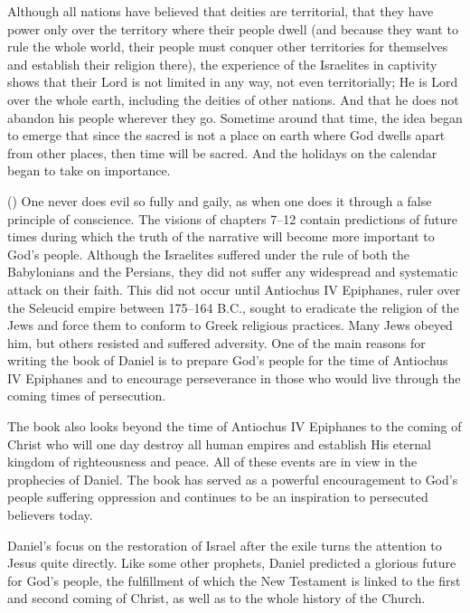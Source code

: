 Although all nations have believed that deities are territorial, that they have power only over the territory where their people dwell (and because they want to rule the whole world, their people must conquer other territories for themselves and establish their religion there), the experience of the Israelites in captivity shows that their Lord is not limited in any way, not even territorially; He is Lord over the whole earth, including the deities of other nations. And that he does not abandon his people wherever they go. Sometime around that time, the idea began to emerge that since the sacred is not a place on earth where God dwells apart from other places, then time will be sacred. And the holidays on the calendar began to take on importance. 


 (\kern-2mm) {
One never does evil so fully and gaily, 
as when one does it through a false principle of conscience.
}
The visions of chapters 7--12 contain predictions of future times during which the truth of the narrative will become more important to God's people.
Although the Israelites suffered under the rule of both the Babylonians and the Persians, they did not suffer any widespread and systematic attack on their faith. This did not occur until Antiochus IV Epiphanes, ruler over the Seleucid empire between 175--164 B.C., sought to eradicate the religion of the Jews and force them to conform to Greek religious practices. Many Jews obeyed him, but others resisted and suffered adversity. 
One of the main reasons for writing the book of Daniel is to prepare God's people for the time of Antiochus IV Epiphanes and to encourage perseverance in those who would live through the coming times of persecution.


The book also looks beyond the time of Antiochus IV Epiphanes to the coming of Christ who will one day destroy all human empires and establish His eternal kingdom of righteousness and peace. All of these events are in view in the prophecies of Daniel.
The book has served as a powerful encouragement to God's people suffering oppression and continues to be an inspiration to persecuted believers today. 



Daniel's focus on the restoration of Israel after the exile turns the attention to Jesus quite directly.
Like some other prophets, Daniel predicted a glorious future for God's people, the fulfillment of which the New Testament 
is linked to the first and second coming of Christ, as well as to the whole history of the Church.

